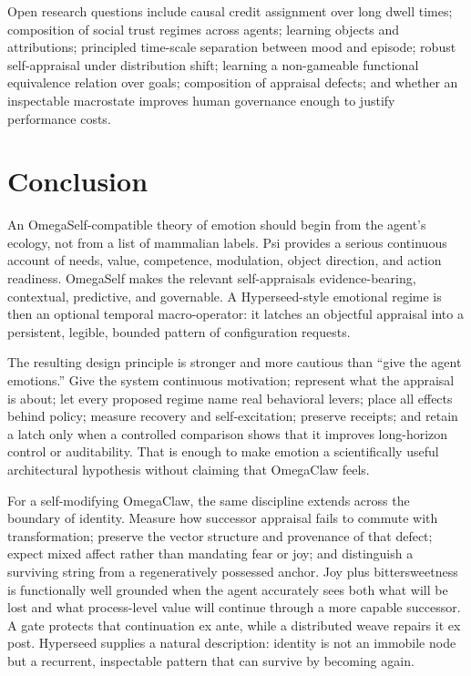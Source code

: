 \documentclass[11pt]{article}
\begin{document}
Open research questions include causal credit assignment over long dwell times;
composition of social trust regimes across agents; learning objects and
attributions; principled time-scale separation between mood and episode; robust
self-appraisal under distribution shift; learning a non-gameable functional
equivalence relation over goals; composition of appraisal defects; and whether
an inspectable macrostate improves human governance enough to justify
performance costs.

\section{Conclusion}

An OmegaSelf-compatible theory of emotion should begin from the agent's ecology,
not from a list of mammalian labels.  Psi provides a serious continuous account
of needs, value, competence, modulation, object direction, and action readiness.
OmegaSelf makes the relevant self-appraisals evidence-bearing, contextual,
predictive, and governable.  A Hyperseed-style emotional regime is then an
optional temporal macro-operator: it latches an objectful appraisal into a
persistent, legible, bounded pattern of configuration requests.

The resulting design principle is stronger and more cautious than ``give the
agent emotions.''  Give the system continuous motivation; represent what the
appraisal is about; let every proposed regime name real behavioral levers; place
all effects behind policy; measure recovery and self-excitation; preserve
receipts; and retain a latch only when a controlled comparison shows that it
improves long-horizon control or auditability.  That is enough to make emotion a
scientifically useful architectural hypothesis without claiming that OmegaClaw
feels.

For a self-modifying OmegaClaw, the same discipline extends across the boundary
of identity.  Measure how successor appraisal fails to commute with
transformation; preserve the vector structure and provenance of that defect;
expect mixed affect rather than mandating fear or joy; and distinguish a
surviving string from a regeneratively possessed anchor.  Joy plus
bittersweetness is functionally well grounded when the agent accurately sees
both what will be lost and what process-level value will continue through a
more capable successor.  A gate protects that continuation ex ante, while a
distributed weave repairs it ex post.  Hyperseed supplies a natural description:
identity is not an immobile node but a recurrent, inspectable pattern that can
survive by becoming again.
\end{document}

